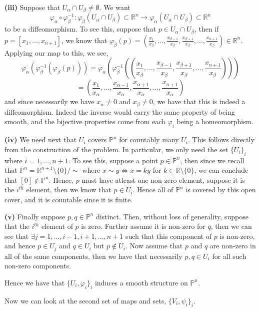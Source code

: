 \documentclass[10pt]{article}
\newcommand{\R}{\mathbb{R}}
\newcommand{\Pro}{\mathbb{P}}
\begin{document}
\newpage

\textbf{(iii)}
Suppose that $U_{\alpha}\cap U_{\beta} \neq \emptyset$. We want
$$\varphi_{\alpha}\circ\varphi_{\beta}^{-1}: \varphi_{\beta}(U_{\alpha}\cap U_{\beta}) \subset \R^{n} \to \varphi_{\alpha}(U_{\alpha}\cap U_{\beta})\subset \R^{n}$$
to be a diffeomorphism. To see this, suppose that $p\in U_{\alpha}\cap U_{\beta}$, then if $p = [x_{1}, \dots, x_{n+1}]$, we know that $\varphi_{\beta}(p) = \left(\frac{x_{1}}{x_{\beta}},\dots,\frac{x_{\beta -1}}{x_{\beta}},\frac{x_{\beta+1}}{x_{\beta}},\dots,\frac{x_{n+1}}{x_{\beta}}\right)\in \R^{n}$. Applying our map to this, we see,
$$\varphi_{\alpha}(\varphi_{\beta}^{-1}(\varphi_{\beta}(p))) = \varphi_{\alpha}\left(\varphi_{\beta}^{-1}\left(\left(\frac{x_{1}}{x_{\beta}},\dots,\frac{x_{\beta -1}}{x_{\beta}},\frac{x_{\beta+1}}{x_{\beta}},\dots,\frac{x_{n+1}}{x_{\beta}}\right)\right)\right)$$
$$ = \left(\frac{x_{1}}{x_{\alpha}},\dots,\frac{x_{\alpha -1}}{x_{\alpha}},\frac{x_{\alpha+1}}{x_{\alpha}},\dots,\frac{x_{n+1}}{x_{\alpha}}\right)$$
and since necessarily we have $x_{\alpha} \neq 0$ and $x_{\beta} \neq 0$, we have that this is indeed a diffeomorphism. Indeed the inverse would carry the same property of being smooth, and the bijective properties come from each $\varphi_{i}$ being a homeomorphism.

\textbf{(iv)}
We need next that $U_{i}$ covers $\Pro^{n}$ for countably many $U_{i}$. This follows directly from the construction of the problem. In particular, we only need the set $\{U_{i}\}_{i}$ where $i = 1,\dots,n+1$. To see this, suppose a point $p\in \Pro^{n}$, then since we recall that $\Pro^{n} = \R^{n+1}\setminus\{0\}/\sim$ where $x \sim y \iff x = ky$ for $k\in \R\setminus \{0\}$, we can conclude that $[0]\notin \Pro^{n}$. Hence, $p$ must have atleast one non-zero element, suppose it is the $i^{th}$ element, then we know that $p\in U_{i}$. Hence all of $\Pro^{n}$ is covered by this open cover, and it is countable since it is finite.

\textbf{(v)} Finally suppose $p,q\in \Pro^{n}$ distinct. Then, without loss of generality, suppose that the $i^{th}$ element of $p$ is zero. Further assume it is non-zero for $q$, then we can see that $\exists j = 1,\dots,i-1,i+1,\dots,n+1$ such that this component of $p$ is non-zero, and hence $p\in U_{j}$ and $q\in U_{i}$ but $p\notin U_{i}$. Now assume that $p$ and $q$ are non-zero in all of the same components, then we have that necessarily $p,q\in U_{i}$ for all such non-zero components.

Hence we have that $\{U_{i},\varphi_{i}\}_{i}$ induces a smooth structure on $\Pro^{n}$.

Now we can look at the second set of maps and sets, $\{V_{i},\psi_{i}\}_{i}$.
\end{document}
